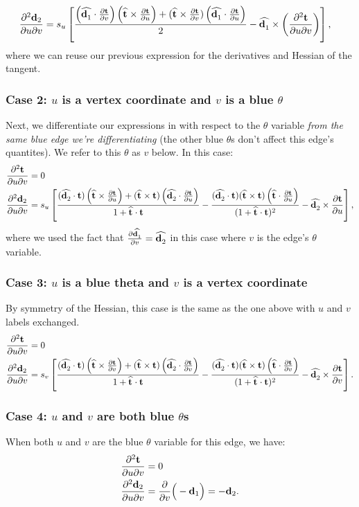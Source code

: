 \documentclass[10pt]{article}
\providecommand{\cross}{\times}
\providecommand{\pder}[2]{\frac{\partial #1}{\partial #2}}
\providecommand{\spder}[3]{\frac{\partial^2 #1}{\partial #2 \partial #3}}
\renewcommand{\vec}[1]{{\bf #1}}
\newcommand\pr[1]{\prettyref{#1}}
\def\d{\vec{d}}
\def\t{\vec{t}}
\providecommand\ts[1]{\widehat{\vec{t}^{#1}}}
\providecommand\ds[2]{\widehat{\vec{d}^{#1}_{#2}}}
\begin{document}
\begin{align*}
    \spder{\d_2}{u}{v} &= s_u \left[
        \frac{\left(\ds{}{1} \cdot \pder{\t}{v}\right) \left(\ts{} \cross \pder{\t}{u}\right) + (\ts{} \cross \pder{\t}{v})\left(\ds{}{1} \cdot \pder{\t}{u}\right)}{2}
          - \ds{}{1} \cross \left(\spder{\t}{u}{v}\right)
      \right],
\end{align*}
where we can reuse our previous expression for the derivatives and Hessian of the tangent.

\subsubsection{Case 2: $u$ is a vertex coordinate and $v$ is a blue $\theta$}
Next, we differentiate our expressions in \pr{eqn:grad_vtx_coord} with respect to the $\theta$ variable \emph{from the same blue edge we're differentiating} (the other blue $\theta$s don't affect this edge's quantites). We refer to this $\theta$ as $v$ below. In this case:
\begin{align*}
    \spder{\t}{u}{v} &= 0 \\
    \spder{\d_2}{u}{v} &= s_u \left[
            \frac{(\ds{}{2} \cdot \t) \left(\ts{} \cross \pder{\t}{u}\right) + (\ts{} \cross \t)\left(\ds{}{2} \cdot \pder{\t}{u}\right)}{1 + \ts{} \cdot \t}
          - \frac{(\ds{}{2} \cdot \t)(\ts{} \cross \t) \left(\ts{} \cdot \pder{\t}{u}\right)}{(1 + \ts{} \cdot \t)^2}
          - \ds{}{2} \cross \pder{\t}{u}
      \right],
\end{align*}
where we used the fact that $\pder{\ds{}{1}}{v} = \ds{}{2}$ in this case where $v$ is the edge's $\theta$ variable.

\subsubsection{Case 3: $u$ is a blue theta and $v$ is a vertex coordinate}
By symmetry of the Hessian, this case is the same as the one above with $u$ and $v$ labels exchanged.
\begin{align*}
    \spder{\t}{u}{v} &= 0 \\
    \spder{\d_2}{u}{v} &= s_v \left[
            \frac{(\ds{}{2} \cdot \t) \left(\ts{} \cross \pder{\t}{v}\right) + (\ts{} \cross \t)\left(\ds{}{2} \cdot \pder{\t}{v}\right)}{1 + \ts{} \cdot \t}
          - \frac{(\ds{}{2} \cdot \t)(\ts{} \cross \t) \left(\ts{} \cdot \pder{\t}{v}\right)}{(1 + \ts{} \cdot \t)^2}
          - \ds{}{2} \cross \pder{\t}{v}
      \right].
\end{align*}

\subsubsection{Case 4: $u$ and $v$ are both blue $\theta$s}
When both $u$ and $v$ are the blue $\theta$ variable for this edge, we have:
\begin{align*}
    \spder{\t}{u}{v} &= 0 \\
    \spder{\d_2}{u}{v} &=
    \pder{}{v}\Big( -\d_1 \Big) = -\d_2.
\end{align*}



\end{document}
